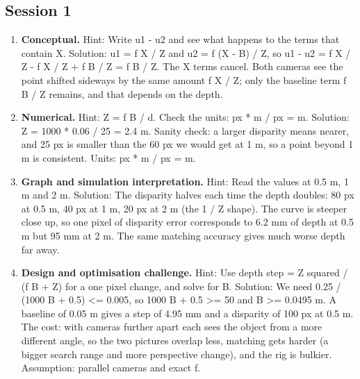 \documentclass[11pt,a4paper]{article}
\begin{document}
\subsection*{Session 1}
\begin{enumerate}[nosep]
\item \textbf{Conceptual.} Hint: Write u1 - u2 and see what happens to the terms that contain X. Solution: u1 = f X / Z and u2 = f (X - B) / Z, so u1 - u2 = f X / Z - f X / Z + f B / Z = f B / Z. The X terms cancel. Both cameras see the point shifted sideways by the same amount f X / Z; only the baseline term f B / Z remains, and that depends on the depth.
\item \textbf{Numerical.} Hint: Z = f B / d. Check the units: px * m / px = m. Solution: Z = 1000 * 0.06 / 25 = 2.4 m. Sanity check: a larger disparity means nearer, and 25 px is smaller than the 60 px we would get at 1 m, so a point beyond 1 m is consistent. Units: px * m / px = m.
\item \textbf{Graph and simulation interpretation.} Hint: Read the values at 0.5 m, 1 m and 2 m. Solution: The disparity halves each time the depth doubles: 80 px at 0.5 m, 40 px at 1 m, 20 px at 2 m (the 1 / Z shape). The curve is steeper close up, so one pixel of disparity error corresponds to 6.2 mm of depth at 0.5 m but 95 mm at 2 m. The same matching accuracy gives much worse depth far away.
\item \textbf{Design and optimisation challenge.} Hint: Use depth step = Z squared / (f B + Z) for a one pixel change, and solve for B. Solution: We need 0.25 / (1000 B + 0.5) \textless{}= 0.005, so 1000 B + 0.5 \textgreater{}= 50 and B \textgreater{}= 0.0495 m. A baseline of 0.05 m gives a step of 4.95 mm and a disparity of 100 px at 0.5 m. The cost: with cameras further apart each sees the object from a more different angle, so the two pictures overlap less, matching gets harder (a bigger search range and more perspective change), and the rig is bulkier. Assumption: parallel cameras and exact f.
\end{enumerate}
\end{document}
